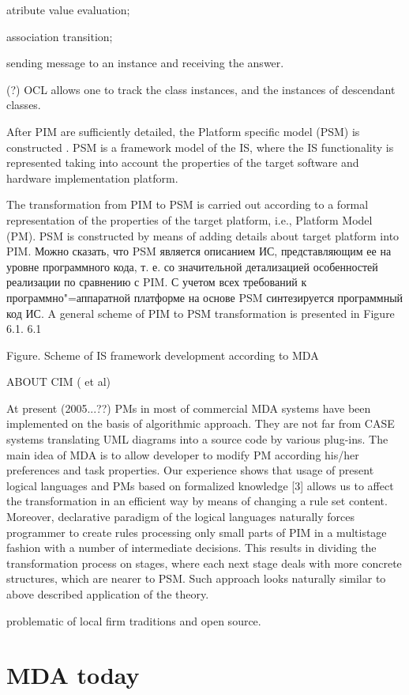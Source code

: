 \documentclass{intech}
\begin{document}
atribute value evaluation;

association transition;

sending message to an instance and receiving the answer.

(?) OCL allows one to track the class instances, and the instances of descendant classes.

After PIM are sufficiently detailed, the Platform specific model (PSM) is constructed \cite{b115}. PSM is a framework model of the IS, where the IS functionality is represented taking into account the properties of the target software and hardware implementation platform.

The transformation from PIM to PSM is carried out according to a formal representation of the properties of the target platform, i.e., Platform Model (PM). PSM is constructed by means of adding details about target platform into PIM.  Можно сказать, что PSM является описанием ИС, представляющим ее на уровне программного кода, т. е. со значительной детализацией особенностей реализации по сравнению с PIM. С учетом всех требований к программно"=аппаратной платформе на основе PSM синтезируется программный код ИС. A general scheme of PIM to PSM transformation is presented in Figure 6.1. 6.1

Figure. Scheme of IS framework development according to MDA


ABOUT CIM (\cite{jurin} et al)

At present (2005...??) PMs in most of commercial MDA systems have been implemented on the basis of algorithmic approach. They are not far from CASE systems translating UML diagrams into a source code by various plug-ins. The main idea of MDA is to allow developer to modify PM according his/her preferences and task properties. Our experience shows that usage of present logical languages and PMs based on formalized knowledge [3] allows us to affect the transformation in an efficient way by means of changing a rule set content. Moreover, declarative paradigm of the logical languages naturally forces programmer to create rules processing only small parts of PIM in a multistage fashion with a number of intermediate decisions. This results in dividing the transformation process on stages, where each next stage deals with more concrete structures, which are nearer to PSM. Such approach looks naturally similar to above described application of the theory.

problematic of local firm traditions and open source.

\section{MDA today}
\label{sec:mda-today}
\end{document}
